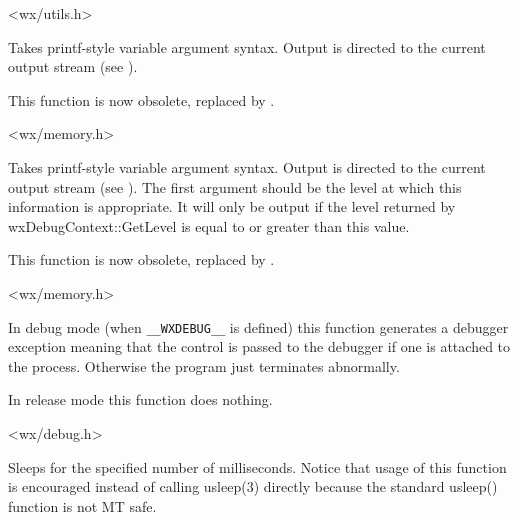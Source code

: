 
<wx/utils.h>

\label{wxtrace}


Takes printf-style variable argument syntax. Output
is directed to the current output stream (see ).

This function is now obsolete, replaced by .


<wx/memory.h>

\label{wxtracelevel}


Takes printf-style variable argument syntax. Output
is directed to the current output stream (see ).
The first argument should be the level at which this information is appropriate.
It will only be output if the level returned by wxDebugContext::GetLevel is equal to or greater than
this value.

This function is now obsolete, replaced by .


<wx/memory.h>

\label{wxtrap}


In debug mode (when {\tt \_\_WXDEBUG\_\_} is defined) this function generates a
debugger exception meaning that the control is passed to the debugger if one is
attached to the process. Otherwise the program just terminates abnormally.

In release mode this function does nothing.


<wx/debug.h>

\label{wxusleep}


Sleeps for the specified number of milliseconds. Notice that usage of this
function is encouraged instead of calling usleep(3) directly because the
standard usleep() function is not MT safe.

